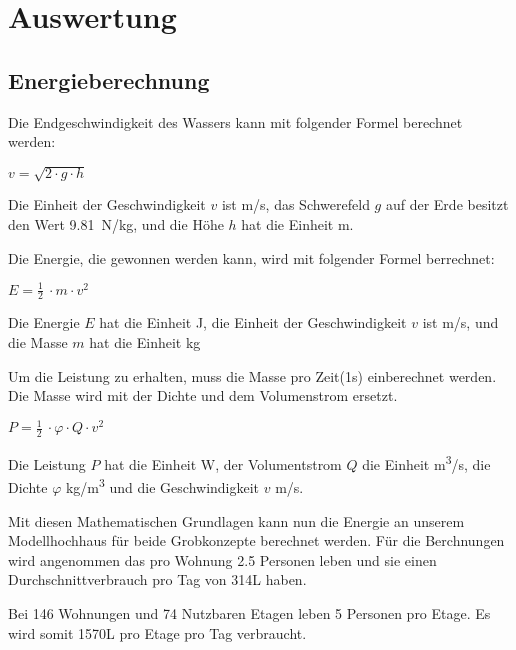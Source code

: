 \section{Auswertung} \label{sec:auswertung}



\subsection{Energieberechnung} \label{subsec:energieberechnung}

Die Endgeschwindigkeit des Wassers kann mit folgender Formel berechnet werden:
\begin{center}
\(v = \sqrt{2 \cdot g \cdot h} \)
\end{center}

Die Einheit der Geschwindigkeit \(v\) ist \si{m/s}, das Schwerefeld \(g\) auf der Erde besitzt den Wert 9.81~\si{N/kg}, und die Höhe \(h\) hat die Einheit \si{m}.

\bigskip

Die Energie, die gewonnen werden kann, wird mit folgender Formel berrechnet:

\begin{center}
\(E =\frac 12\ \cdot m \cdot v^2\)
\end{center}

Die Energie \(E\) hat die Einheit \si{J}, die Einheit der Geschwindigkeit \(v\) ist \si{m/s}, und die Masse \(m\) hat die Einheit \si{kg}

\bigskip

Um die Leistung zu erhalten, muss die Masse pro Zeit(1s) einberechnet werden. Die Masse wird mit der Dichte und dem Volumenstrom ersetzt.

\begin{center}
\(P =\frac 12\ \cdot \varphi \cdot Q \cdot v^2\)
\end{center}

Die Leistung \(P\) hat die Einheit \si{W}, der Volumentstrom \(Q\) die Einheit \si{m^3/s}, die Dichte \(\varphi\) \si{kg/m^3} und die Geschwindigkeit \(v\) \si{m/s}.

\newpage

Mit diesen Mathematischen Grundlagen kann nun die Energie an unserem Modellhochhaus für beide Grobkonzepte berechnet werden. Für die Berchnungen wird angenommen das pro Wohnung 2.5 Personen leben und sie einen Durchschnittverbrauch pro Tag von 314\si{L} haben.

Bei 146 Wohnungen und 74 Nutzbaren Etagen leben 5 Personen pro Etage. Es wird somit 1570\si{L} pro Etage pro Tag verbraucht.

